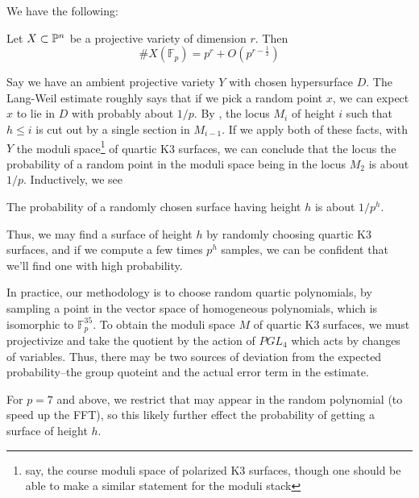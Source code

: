 
We have the following:

\begin{thm}
	Let \(X \subset \mathbb{P}^{n}\)
	be a projective variety of dimension \(r\). 
	Then 
	\[
		\#X(\mathbb{F}_{p}) = p^r + O(p^{r - \frac{1}{2}})
	\] 
\end{thm}

Say we have an ambient projective variety
\(Y\) with chosen
hypersurface \(D\).
The Lang-Weil estimate roughly
says that if we pick a random point \(x\),
we can expect \(x\) to lie in \(D\) 
with probably about \(1 / p\).
By \cite[Section~7]{artin-1974-k3-surfaces}, 
the locus \(M_{i}\) of height \(i\) such that \(h \leq i\)
is cut out by a single section in 
\(M_{i-1}\).
If we apply both of these facts,
with \(Y\) the 
moduli space\footnote{
	say, the course moduli space of polarized K3 surfaces,
	though one should be able to make a similar statement
	for the moduli stack
} of quartic K3 surfaces,
we can conclude that the locus 
the probability of a random point 
in the moduli space being in the locus
\(M_{2}\) is about \(1 / p\). 
Inductively, we see 

\begin{heur}
The probability of a randomly
chosen surface having height \(h\) is about \(1 / p^{h}\).
\end{heur}

Thus, we may find a surface of height \(h\) by 
randomly choosing quartic K3 surfaces, and 
if we compute a few times \(p^{h}\) 
samples, we can be confident that we'll find
one with high probability.

In practice, our methodology is to choose
random quartic polynomials,
by sampling a point in the vector space
of homogeneous polynomials, which is isomorphic to
\(\mathbb{F}_{p}^{35}\).
To obtain the moduli space \(M\) of quartic K3 surfaces, 
we must projectivize and take the quotient by the action of 
\(PGL_{4}\) which acts by changes of variables. 
Thus, there may be two sources of deviation from the expected
probability--the group quoteint and the actual 
error term in the estimate.
 
For \(p = 7\) and above, we restrict 
that may appear in the random polynomial (to speed up the FFT),
so this likely further effect the probability of getting
a surface of height \(h\).
